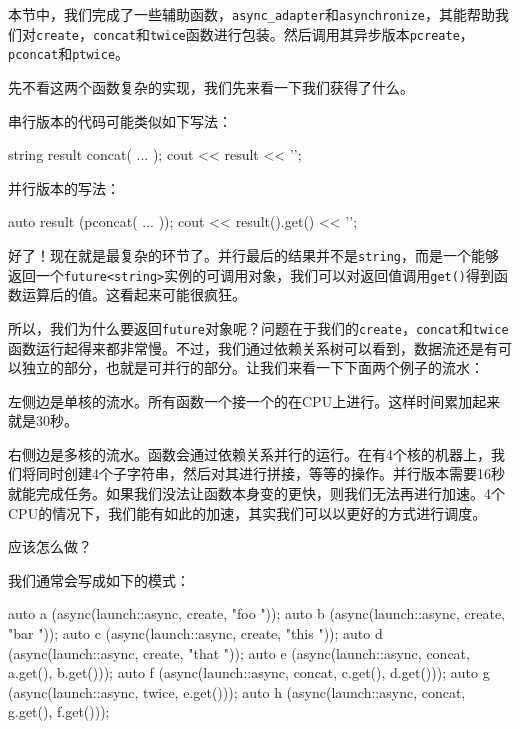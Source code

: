 本节中，我们完成了一些辅助函数，\texttt{async\_adapter}和\texttt{asynchronize}，其能帮助我们对\texttt{create}，\texttt{concat}和\texttt{twice}函数进行包装。然后调用其异步版本\texttt{pcreate}，\texttt{pconcat}和\texttt{ptwice}。

先不看这两个函数复杂的实现，我们先来看一下我们获得了什么。

串行版本的代码可能类似如下写法：

\begin{codebox}[cpp]
string result {concat( ... )};
cout << result << '\n';
\end{codebox}

并行版本的写法：

\begin{codebox}[cpp]
auto result (pconcat( ... ));
cout << result().get() << '\n';
\end{codebox}

好了！现在就是最复杂的环节了。并行最后的结果并不是\texttt{string}，而是一个能够返回一个\texttt{future<string>}实例的可调用对象，我们可以对返回值调用\texttt{get()}得到函数运算后的值。这看起来可能很疯狂。

所以，我们为什么要返回\texttt{future}对象呢？问题在于我们的\texttt{create}，\texttt{concat}和\texttt{twice}函数运行起得来都非常慢。不过，我们通过依赖关系树可以看到，数据流还是有可以独立的部分，也就是可并行的部分。让我们来看一下下面两个例子的流水：


左侧边是单核的流水。所有函数一个接一个的在CPU上进行。这样时间累加起来就是30秒。

右侧边是多核的流水。函数会通过依赖关系并行的运行。在有4个核的机器上，我们将同时创建4个子字符串，然后对其进行拼接，等等的操作。并行版本需要16秒就能完成任务。如果我们没法让函数本身变的更快，则我们无法再进行加速。4个CPU的情况下，我们能有如此的加速，其实我们可以以更好的方式进行调度。

应该怎么做？

我们通常会写成如下的模式：

\begin{codebox}[cpp]
auto a (async(launch::async, create, "foo "));
auto b (async(launch::async, create, "bar "));
auto c (async(launch::async, create, "this "));
auto d (async(launch::async, create, "that "));
auto e (async(launch::async, concat, a.get(), b.get()));
auto f (async(launch::async, concat, c.get(), d.get()));
auto g (async(launch::async, twice, e.get()));
auto h (async(launch::async, concat, g.get(), f.get()));
\end{codebox}

